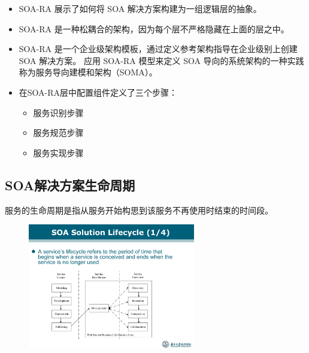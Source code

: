\begin{itemize}
    \item SOA-RA 展示了如何将 SOA 解决方案构建为一组逻辑层的抽象。
    \item SOA-RA 是一种松耦合的架构，因为每个层不严格隐藏在上面的层之中。
    \item SOA-RA 是一个企业级架构模板，通过定义参考架构指导在企业级别上创建 SOA 解决方案。
    应用 SOA-RA 模型来定义 SOA 导向的系统架构的一种实践称为服务导向建模和架构（SOMA）。
    \item 在SOA-RA层中配置组件定义了三个步骤：
    \vspace{-0.8em}
    \begin{multicols}{3}
    \begin{itemize}
        \item 服务识别步骤
        \item 服务规范步骤
        \item 服务实现步骤
    \end{itemize}
    \end{multicols}
    \vspace{-1em}
\end{itemize}

\subsection{SOA解决方案生命周期}
服务的生命周期是指从服务开始构思到该服务不再使用时结束的时间段。
\begin{figure}[H]
    \vspace{-0.5em}
	\centering
	\includegraphics[width=0.65\textwidth]{images/SOA Solution Lifecycle.pdf}
    \vspace{-1em}
\end{figure}

\vspace{-0.5em}
\begin{spacing}{1.2}
\centering
    
\end{spacing}


